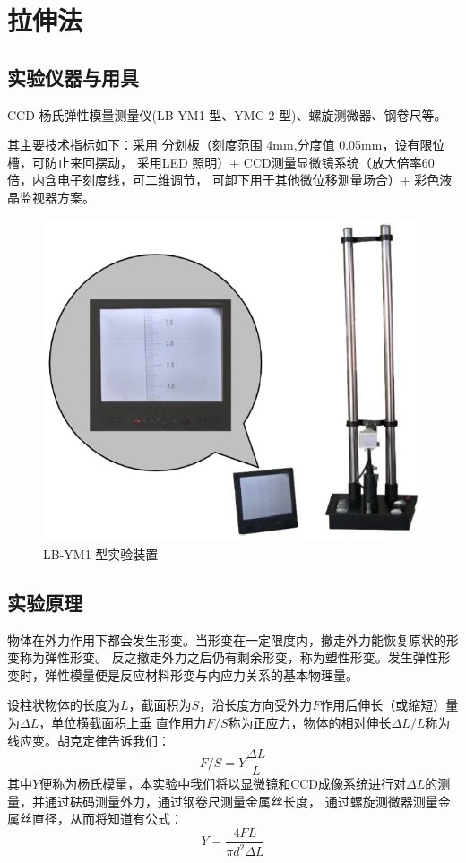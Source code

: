 \documentclass[UTF8]{article}
\theoremstyle{MyLineTheoremStyle} %
\theoremstyle{MyBlockTheoremStyle} %
\theoremstyle{MySubsubsectionStyle} %
\begin{document}
\section{拉伸法}
\subsection{实验仪器与用具}

CCD 杨氏弹性模量测量仪(LB-YM1 型、YMC-2 型)、螺旋测微器、钢卷尺等。

其主要技术指标如下：采用
分划板（刻度范围 4mm,分度值 0.05mm，设有限位槽，可防止来回摆动，
采用LED 照明）+
CCD测量显微镜系统（放大倍率60倍，内含电子刻度线，可二维调节，
可卸下用于其他微位移测量场合）+
彩色液晶监视器方案。
\begin{figure}[H]\centering
    \includegraphics[width=0.4\columnwidth]{assets/0/da2dd09fb93428ae0fb1bc23c8c81af2.png}
    \caption{LB-YM1 型实验装置}
\end{figure}



\subsection{实验原理}
物体在外力作用下都会发生形变。当形变在一定限度内，撤走外力能恢复原状的形变称为弹性形变。
反之撤走外力之后仍有剩余形变，称为塑性形变。发生弹性形变时，弹性模量便是反应材料形变与内应力关系的基本物理量。

设柱状物体的长度为$L$，截面积为$S$，沿长度方向受外力$F$作用后伸长（或缩短）量为$\Delta L$，单位横截面积上垂
直作用力$F/S$称为正应力，物体的相对伸长$\Delta L/L$称为线应变。胡克定律告诉我们：
\begin{equation}
   F/S=Y\frac{\Delta L}{L} 
\end{equation}
其中$Y$便称为杨氏模量，本实验中我们将以显微镜和CCD成像系统进行对$\Delta L$的测量，并通过砝码测量外力，通过钢卷尺测量金属丝长度，
通过螺旋测微器测量金属丝直径，从而将知道有公式：
\begin{equation}
    Y=\frac{4FL}{\pi d^2\Delta L}
\end{equation}
\end{document}
